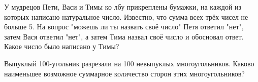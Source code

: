 \documentclass[11pt, a4paper]{common/document_template}
\begin{document}
\begin{exercise}[29]
У мудрецов Пети, Васи и Тимы ко лбу прикреплены бумажки, на каждой из которых написано натуральное число. Известно, что сумма всех трёх чисел не больше 5. На вопрос "можешь ли ты назвать своё число" Петя ответил "нет", затем Вася ответил "нет", а затем Тима назвал своё число и обосновал ответ. Какое число было написано у Тимы?
\end{exercise}

\begin{exercise}[32]
Выпуклый 100-угольник разрезали на 100 невыпуклых многоугольников. Каково наименьшее возможное суммарное количество сторон этих многоугольников?
\end{exercise}
\end{document}
